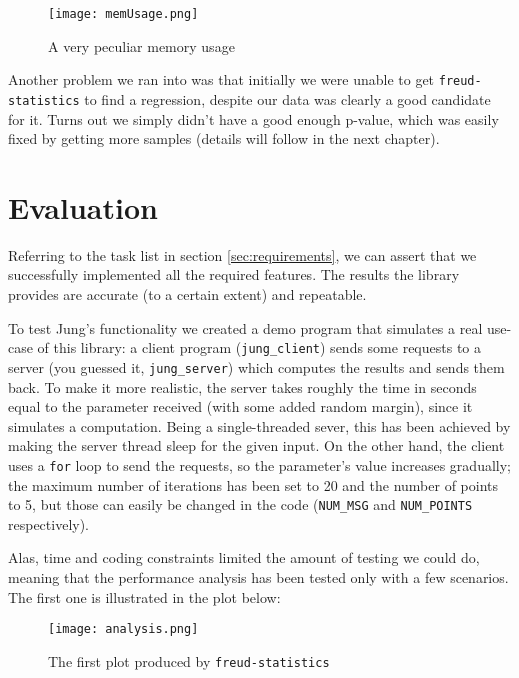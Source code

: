         \begin{figure}[H]
            \centering
            \texttt{[image: memUsage.png]}
            \caption{A very peculiar memory usage}
            \label{fig:memUsage}
        \end{figure}

        Another problem we ran into was that initially we were unable to get \texttt{freud-statistics} to find a
        regression, despite our data was clearly a good candidate for it. Turns out we simply didn't have a
        good enough p-value, which was easily fixed by getting more samples (details will follow in the next
        chapter).        


\chapter{Evaluation}


    Referring to the task list in section \ref{sec:requirements}, we can assert that we successfully implemented
    all the required features. The results the library provides are accurate (to a certain extent) and repeatable.

    To test Jung's functionality we created a demo program that simulates a real use-case of this library:
    a client program (\texttt{jung\_client}) sends some requests to a server (you guessed it, 
    \texttt{jung\_server}) which computes the results and sends them back. To make it more realistic,
    the server takes roughly the time in seconds equal to the parameter received (with some added
    random margin), since it simulates a computation. Being a single-threaded sever, this has been
    achieved by making the server thread sleep for the given input. On the other hand, the client
    uses a \texttt{for} loop to send the requests, so the parameter's value increases gradually;
    the maximum number of iterations has been set to 20 and the number of points to 5,
    but those can easily be changed in the code (\texttt{NUM\_MSG} and \texttt{NUM\_POINTS} respectively).

    Alas, time and coding constraints limited the amount of testing we could do,
    meaning that the performance analysis has been tested only with a few scenarios. The first one
    is illustrated in the plot below:

    \begin{figure}[H]
        \centering
        \texttt{[image: analysis.png]}
        \caption{The first plot produced by \texttt{freud-statistics}}
        \label{fig:analysis1}
    \end{figure}

